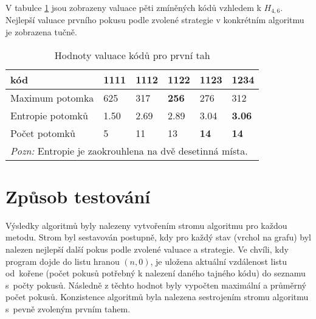 
V tabulce \ref{tabvaluaceprvnichtahu} jsou zobrazeny valuace pěti zmíněných kódů vzhledem k $H_{4,6}$. Nejlepší valuace prvního pokusu podle zvolené strategie v konkrétním algoritmu je zobrazena tučně. 


\begin{table}[h]
\centering
\begin{tabular}{l l l l l l}
\toprule
kód & 1111 & 1112 & 1122 & 1123 & 1234 \\
\midrule

Maximum potomka & 625 & 317 & \textbf{256} & 276 & 312 \\
Entropie potomků & 1.50 & 2.69 & 2.89 & 3.04 & \textbf{3.06}\\




Počet potomků & 5 & 11 & 13 & \textbf{14} & \textbf{14} \\

\bottomrule
\multicolumn{6}{l}{\footnotesize \textit{Pozn:}
Entropie je zaokrouhlena na dvě desetinná místa.
}

\end{tabular}
\caption{Hodnoty valuace kódů pro první tah}
\label{tabvaluaceprvnichtahu}
\end{table}



\section{Způsob testování}
Výsledky algoritmů byly nalezeny vytvořením stromu algoritmu pro každou metodu. Strom byl sestavován postupně, kdy pro každý stav (vrchol na grafu) byl nalezen nejlepší další pokus podle zvolené valuace a strategie. Ve chvíli, kdy program dojde do listu hranou $(n,0)$, je uložena aktuální vzdálenost listu od~kořene (počet pokusů potřebný k nalezení daného tajného kódu) do seznamu s~počty pokusů. 
Následně z těchto hodnot byly vypočten maximální a průměrný počet pokusů. Konzistence algoritmů byla nalezena sestrojením stromu algoritmu s~pevně zvoleným prvním tahem.

